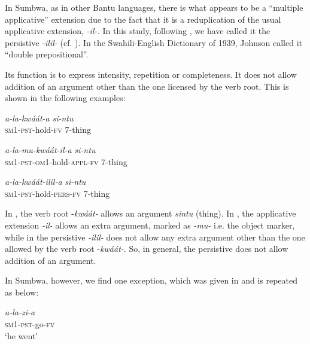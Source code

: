 \documentclass[output=paper		  ]{langscibook}
\begin{document}
{In Sumbwa, as in other Bantu languages, there is what appears to be a ``multiple applicative'' extension due to the fact that it is a reduplication of the usual applicative extension,} {\textit{{}-il-.}} {In this study, following \citet[144]{Guthrie1971}, we have called it the persistive}{ \textit{-ilil-}} {(cf. ). In the Swahili-English Dictionary of 1939, Johnson called it ``double prepositional''.}

{Its function is to express intensity, repetition or completeness. It does not allow addition of an argument other than the one licensed by the verb root. This is shown in the following examples:}

\ea\label{ex:kahigi:61}
    \ea\label{ex:kahigi:61a} \gll \textit{a-la-kwáát-a}      \textit{si-ntu}\\
    \textsc{sm1-pst-}hold-\textsc{fv}  7-thing\\

    \ex\label{ex:kahigi:61b} \gll \textit{a-la-mu-kwáát-il-a}            \textit{si-ntu}\\
 \textsc{sm1-pst-om1-}hold-\textsc{appl-fv}   7-thing\\

    \ex\label{ex:kahigi:61c} \gll \textit{a-la-kwáát-ilil-a}           \textit{si-ntu}\\
 \textsc{sm1-pst-}hold-\textsc{pers-fv}    7-thing\\
    \z
\z

{In , the verb root -}{\textit{kwáát-}} {allows an argument} {\textit{sintu} }{(thing). In , the applicative extension} {\textit{{}-il-}} {allows an extra argument, marked as} {\textit{{}-mu-} }{i.e. the object marker, while in  the persistive} {\textit{{}-ilil-}} {does not allow any extra argument other than the one allowed by the verb root -}{\textit{kwáát-}}{. So, in general, the persistive does not allow addition of an argument.}

{In Sumbwa, however, we find one exception, which was given in  and is repeated as  below:}

\ea\label{ex:kahigi:62}
    \ea\label{ex:kahigi:62a} \gll \textit{a-la-zi-a}\\
           \textsc{sm1-pst-}go-\textsc{fv}\\
        \glt ‘he went’
\end{document}
